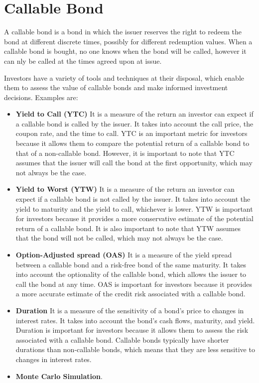 \documentclass[12pt,a4paper]{article}
\begin{document}
\clearpage
\section{Callable Bond}
A callable bond is a bond in which the issuer reserves the right to redeem the bond at different discrete times, possibly for different redemption values. When a callable bond is bought, no one knows when the bond will be called, however it can nly be called at the times agreed upon at issue.

Investors have a variety of tools and techniques at their disposal, which enable them to assess the value of callable bonds and make informed investment decisions. Examples are:
\begin{itemize}
\item \textbf{Yield to Call (YTC)} It is a measure of the return an investor can expect if a callable bond is called by the issuer. It takes into account the call price, the coupon rate, and the time to call. YTC is an important metric for investors because it allows them to compare the potential return of a callable bond to that of a non-callable bond. However, it is important to note that YTC assumes that the issuer will call the bond at the first opportunity, which may not always be the case.
\item \textbf{Yield to Worst (YTW)} It is a measure of the return an investor can expect if a callable bond is not called by the issuer. It takes into account the yield to maturity and the yield to call, whichever is lower. YTW is important for investors because it provides a more conservative estimate of the potential return of a callable bond. It is also important to note that YTW assumes that the bond will not be called, which may not always be the case.
\item \textbf{Option-Adjusted spread (OAS)} It is a measure of the yield spread between a callable bond and a risk-free bond of the same maturity. It takes into account the optionality of the callable bond, which allows the issuer to call the bond at any time. OAS is important for investors because it provides a more accurate estimate of the credit risk associated with a callable bond.
\item \textbf{Duration} It is a measure of the sensitivity of a bond's price to changes in interest rates. It takes into account the bond's cash flows, maturity, and yield. Duration is important for investors because it allows them to assess the risk associated with a callable bond. Callable bonds typically have shorter durations than non-callable bonds, which means that they are less sensitive to changes in interest rates.
\item \textbf{Monte Carlo Simulation}.
\end{itemize}
\end{document}
